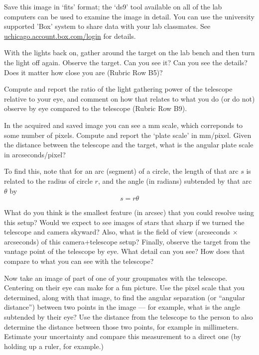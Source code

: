 \begin{steps}
	\item Save this image in ‘fits’ format; the ‘ds9’ tool available on all of the lab
	computers can be used to examine the image in detail. You can use the university supported
	’Box’ system to share data with your lab classmates. See \url{uchicago.account.box.com/login}
	for details.
	
	\item With the lights back on, gather around the target on the lab bench and then
	turn the light off again. Observe the target. Can you see it? Can you see the details? Does
	it matter how close you are (Rubric Row B5)?
	
	\item Compute and report the ratio of the light gathering power of
	the telescope relative to your eye, and comment on how that relates to what you do (or do
	not) observe by eye compared to the telescope (Rubric Row B9).
	
	\item In the acquired and saved image you can see a mm scale, which correponds to some number
	of pixels. Compute and report the ‘plate scale’ in mm/pixel. Given the distance between the
	telescope and the target, what is the angular plate scale in arcseconds/pixel?
	
	To find this, note that for an arc (segment) of a circle, the length of that arc $s$ is related to the radius of circle $r$, and the angle (in radians) subtended by that arc $\theta$ by
	\begin{equation}
	s = r \theta
	\end{equation}
	
	\item What do you
	think is the smallest feature (in arcsec) that you could resolve using this setup? Would we
	expect to see images of stars that sharp if we turned the telescope and camera skyward?
	Also, what is the field of view (arcseconds $\times$
	arcseconds) of this camera+telescope setup? Finally, observe the target from the vantage
	point of the telescope by eye. What detail can you see? How does that compare to what
	you can see with the telescope?
	
	\item Now take an image of part of one of your groupmates with the telescope. Centering on their eye can make for a fun picture. Use the pixel scale that you determined, along with that image, to find the angular separation (or ``angular distance'') between two points in the image --- for example, what is the angle subtended by their eye? Use the distance from the telescope to the person to also determine the distance between those two points, for example in millimeters. Estimate your uncertainty and compare this measurement to a direct one (by holding up a ruler, for example.)
\end{steps}

